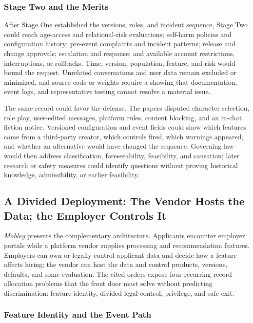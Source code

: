 \subsubsection{Stage Two and the Merits}

After Stage One established the versions, roles, and incident sequence, Stage Two could reach age-access and relational-risk evaluations; self-harm policies and configuration history; pre-event complaints and incident patterns; release and change approvals; escalation and response; and available account restrictions, interruptions, or rollbacks. Time, version, population, feature, and risk would bound the request. Unrelated conversations and user data remain excluded or minimized, and source code or weights require a showing that documentation, event logs, and representative testing cannot resolve a material issue.

The same record could favor the defense. The papers disputed character selection, role play, user-edited messages, platform rules, content blocking, and an in-chat fiction notice. Versioned configuration and event fields could show which features came from a third-party creator, which controls fired, which warnings appeared, and whether an alternative would have changed the sequence. Governing law would then address classification, foreseeability, feasibility, and causation; later research or safety measures could identify questions without proving historical knowledge, admissibility, or earlier feasibility.

\subsection{A Divided Deployment: The Vendor Hosts the Data; the Employer Controls It}
\label{sec:mobley-application}

\emph{Mobley} presents the complementary architecture. Applicants encounter employer portals while a platform vendor supplies processing and recommendation features. Employers can own or legally control applicant data and decide how a feature affects hiring; the vendor can host the data and control products, versions, defaults, and some evaluation. The cited orders expose four recurring record-allocation problems that the front door must solve without predicting discrimination: feature identity, divided legal control, privilege, and safe exit.

\subsubsection{Feature Identity and the Event Path}

